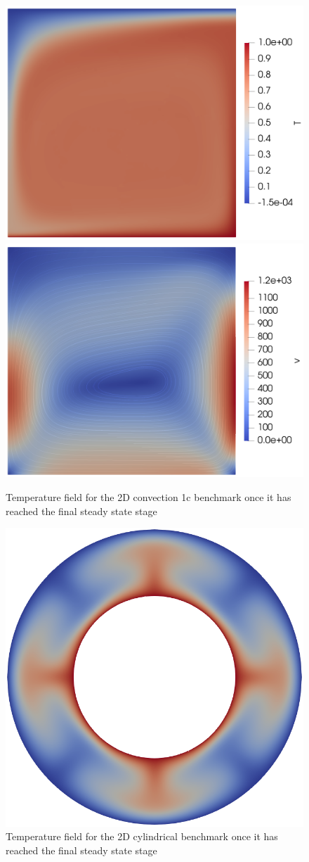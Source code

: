 \begin{figure}
	\centering
	\includegraphics[width=0.75\linewidth]{img/chapter2/benchmarks/temp.png}
	\includegraphics[width=0.75\linewidth]{img/chapter2/benchmarks/streamlines.png}
	\caption{Temperature field for the 2D convection 1c benchmark once it has reached the final steady state stage}
	\label{fig:convection_2a}
\end{figure}

\begin{figure}
	\centering
	\includegraphics[width=0.75\linewidth]{img/chapter2/benchmarks/t_1.png}
	\caption{Temperature field for the 2D cylindrical benchmark once it has reached the final steady state stage}
	\label{fig:cylindrical_shell}
\end{figure}


